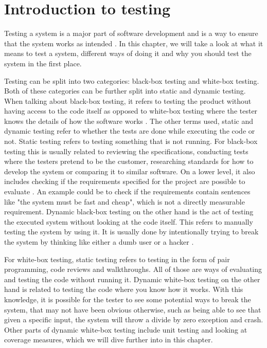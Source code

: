 \section{Introduction to testing}
Testing a system is a major part of software development and is a way to ensure that the system works as intended \cite{SoftwareTesting}.
In this chapter, we will take a look at what it means to test a system, different ways of doing it and why you should test the system in the first place.

Testing can be split into two categories: black-box testing and white-box testing.
Both of these categories can be further split into static and dynamic testing.
When talking about black-box testing, it refers to testing the product without having access to the code itself as opposed to white-box testing where the tester knows the details of how the software works \cite{SoftwareTesting}.
The other terms used, static and dynamic testing refer to whether the tests are done while executing the code or not.
Static testing refers to testing something that is not running.
For black-box testing this is usually related to reviewing the specifications, conducting tests where the testers pretend to be the customer, researching standards for how to develop the system or comparing it to similar software.
On a lower level, it also includes checking if the requirements specified for the project are possible to evaluate \cite{ToVSlides1}.
An example could be to check if the requirements contain sentences like "the system must be fast and cheap", which is not a directly measurable requirement.
Dynamic black-box testing on the other hand is the act of testing the executed system without looking at the code itself.
This refers to manually testing the system by using it.
It is usually done by intentionally trying to break the system by thinking like either a dumb user or a hacker \cite{SoftwareTesting}.

For white-box testing, static testing refers to testing in the form of pair programming, code reviews and walkthroughs.
All of those are ways of evaluating and testing the code without running it.
Dynamic white-box testing on the other hand is related to testing the code where you know how it works.
With this knowledge, it is possible for the tester to see some potential ways to break the system, that may not have been obvious otherwise, such as being able to see that given a specific input, the system will throw a divide by zero exception and crash\cite{ToVSlides1}.
Other parts of dynamic white-box testing include unit testing and looking at coverage measures, which we will dive further into in this chapter.
